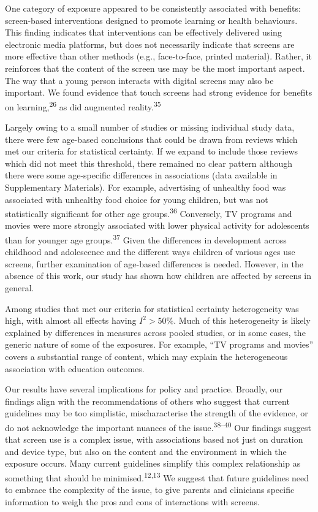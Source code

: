 \documentclass[
  english,
  man]{apa6}
\begin{document}
One category of exposure appeared to be consistently associated with benefits: screen-based interventions designed to promote learning or health behaviours.
This finding indicates that interventions can be effectively delivered using electronic media platforms, but does not necessarily indicate that screens are more effective than other methods (e.g., face-to-face, printed material).
Rather, it reinforces that the content of the screen use may be the most important aspect.
The way that a young person interacts with digital screens may also be important.
We found evidence that touch screens had strong evidence for benefits on learning,\textsuperscript{26} as did augmented reality.\textsuperscript{35}

Largely owing to a small number of studies or missing individual study data, there were few age-based conclusions that could be drawn from reviews which met our criteria for statistical certainty.
If we expand to include those reviews which did not meet this threshold, there remained no clear pattern although there were some age-specific differences in associations (data available in Supplementary Materials).
For example, advertising of unhealthy food was associated with unhealthy food choice for young children, but was not statistically significant for other age groups.\textsuperscript{36}
Conversely, TV programs and movies were more strongly associated with lower physical activity for adolescents than for younger age groups.\textsuperscript{37}
Given the differences in development across childhood and adolescence and the different ways children of various ages use screens, further examination of age-based differences is needed.
However, in the absence of this work, our study has shown how children are affected by screens in general.

Among studies that met our criteria for statistical certainty heterogeneity was high, with almost all effects having \(I^2 > 50\%\).
Much of this heterogeneity is likely explained by differences in measures across pooled studies, or in some cases, the generic nature of some of the exposures.
For example, ``TV programs and movies'' covers a substantial range of content, which may explain the heterogeneous association with education outcomes.

Our results have several implications for policy and practice.
Broadly, our findings align with the recommendations of others who suggest that current guidelines may be too simplistic, mischaracterise the strength of the evidence, or do not acknowledge the important nuances of the issue.\textsuperscript{38--40}
Our findings suggest that screen use is a complex issue, with associations based not just on duration and device type, but also on the content and the environment in which the exposure occurs.
Many current guidelines simplify this complex relationship as something that should be minimised.\textsuperscript{12,13}
We suggest that future guidelines need to embrace the complexity of the issue, to give parents and clinicians specific information to weigh the pros and cons of interactions with screens.
\end{document}
